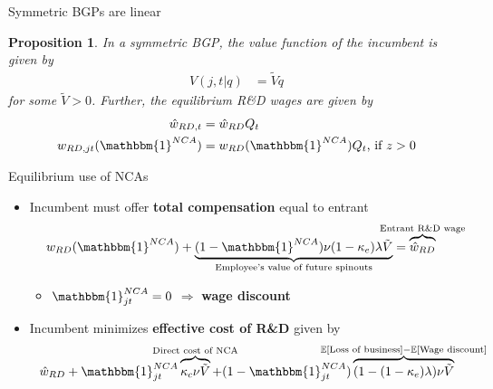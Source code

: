 \documentclass[english,usenames,dvipsnames]{beamer}
\newtheorem{proposition}{Proposition}
\begin{document}
\begin{frame}{Symmetric BGPs are linear}\label{proposition:hjb_scaling}
	\hyperlink{closing_the_model}{}
	\small
	\begin{proposition}
		In a symmetric BGP, the value function of the incumbent is given by
		\begin{align*}
		V(j,t|q) &= \tilde{V} q
		\end{align*}
		for some $\tilde{V} > 0$. Further, the equilibrium R\&D wages are given by 
		\begin{align*}
		\hat{w}_{RD,t} &= \hat{w}_{RD} Q_t \\
		w_{RD,jt}(\mathbbm{1}^{NCA}) &= w_{RD}(\mathbbm{1}^{NCA}) Q_t \textrm{, if $z > 0$}
		\end{align*}
	\end{proposition}
\end{frame}

\begin{frame}{Equilibrium use of NCAs}\label{use_of_ncas_details}
	\hyperlink{use_of_ncas}{}
	\begin{itemize}
		\item Incumbent must offer \alert{\textbf{total compensation}} equal to entrant
		\begin{align*}
		w_{RD}(\mathbbm{1}^{NCA}) + \underbrace{(1-\mathbbm{1}^{NCA}) \nu (1-\kappa_e) \lambda \tilde{V}}_{\mathclap{\text{Employee's value of future spinouts}}} &= \overbrace{\hat{w}_{RD}}^{\mathclap{\text{Entrant R\&D wage}}} 
		\end{align*}
		\begin{itemize}
			\item $\mathbbm{1}^{NCA}_{jt} = 0$ $\Rightarrow$ \alert{\textbf{wage discount}}
		\end{itemize}
		\item Incumbent minimizes \alert{\textbf{effective cost of R\&D}} given by
		\begin{align*}
		\hat{w}_{RD} + \mathbbm{1}^{NCA}_{jt} \overbrace{ \kappa_c \nu \tilde{V}}^{\mathclap{\text{Direct cost of NCA}}} + (1- \mathbbm{1}^{NCA}_{jt}) \overbrace{(1 - (1-\kappa_e) \lambda) \nu \tilde{V}}^{\mathclap{\mathbb{E}[\text{Loss of business}] - \mathbb{E}[\text{Wage discount}]}} 
		\end{align*}
	\end{itemize}
\end{frame}
\end{document}
